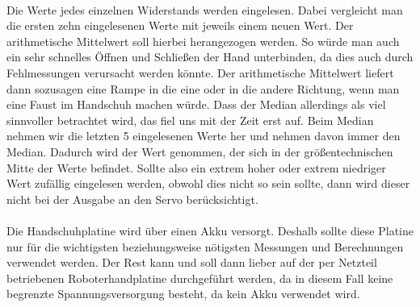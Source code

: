 \documentclass[11pt]{article}
\begin{document}
\\
Die Werte jedes einzelnen Widerstands werden eingelesen. Dabei vergleicht man die ersten zehn eingelesenen Werte mit jeweils 
einem neuen Wert. Der arithmetische Mittelwert soll hierbei herangezogen werden. So würde man auch ein sehr schnelles Öffnen 
und Schließen der Hand unterbinden, da dies auch durch Fehlmessungen verursacht werden könnte. Der arithmetische Mittelwert 
liefert dann sozusagen eine Rampe in die eine oder in die andere Richtung, wenn man eine Faust im Handschuh machen würde. Dass 
der Median allerdings als viel sinnvoller betrachtet wird, das fiel uns mit der Zeit erst auf. Beim Median nehmen wir die 
letzten 5 eingelesenen Werte her und nehmen davon immer den Median. Dadurch wird der Wert genommen, der sich in der 
größentechnischen Mitte der Werte befindet. Sollte also ein extrem hoher oder extrem niedriger Wert zufällig eingelesen werden, 
obwohl dies nicht so sein sollte, dann wird dieser nicht bei der Ausgabe an den Servo berücksichtigt. \\
\\
Die Handschuhplatine wird über einen Akku versorgt. Deshalb sollte diese Platine nur für die wichtigsten beziehungsweise 
nötigsten Messungen und Berechnungen verwendet werden. Der Rest kann und soll dann lieber auf der per Netzteil betriebenen 
Roboterhandplatine durchgeführt werden, da in diesem Fall keine begrenzte Spannungsversorgung besteht, da kein Akku verwendet 
wird.
\\
\end{document}
